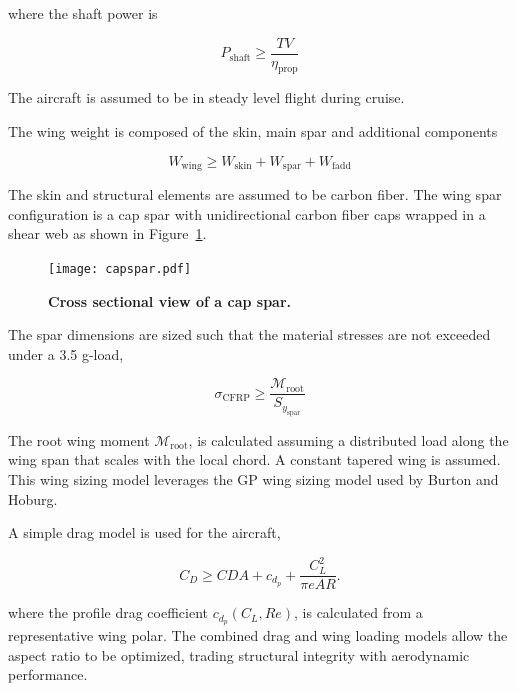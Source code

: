 \documentclass[]{aiaa-tc}%
\begin{document}
where the shaft power is 

\begin{equation}
    P_{\mathrm{shaft}} \geq \frac{TV}{\eta_{\mathrm{prop}}}
\end{equation}

The aircraft is assumed to be in steady level flight during cruise. 

The wing weight is composed of the skin, main spar and additional components

\begin{equation}
    W_{\mathrm{wing}} \geq W_{\mathrm{skin}} + W_{\mathrm{spar}} + W_{\mathrm{fadd}}
\end{equation}

The skin and structural elements are assumed to be carbon fiber.  
The wing spar configuration is a cap spar with unidirectional carbon fiber caps wrapped in a shear web as shown in Figure~\ref{f:capspar}.  

\begin{figure}[h!]
	\begin{center}
	\texttt{[image: capspar.pdf]}
    \caption{\textbf{Cross sectional view of a cap spar.}}
	\label{f:capspar}
	\end{center}
\end{figure}

The spar dimensions are sized such that the material stresses are not exceeded under a 3.5 g-load,

\begin{equation}
    \sigma_{\mathrm{CFRP}} \geq \frac{\mathcal{M}_{\mathrm{root}}}{S_{y_{\mathrm{spar}}}}
\end{equation}

The root wing moment $\mathcal{M}_{\mathrm{root}}$, is calculated assuming a distributed load along the wing span that scales with the local chord.\cite{bending}
A constant tapered wing is assumed.  
This wing sizing model leverages the GP wing sizing model used by Burton and Hoburg.\cite{burton_solar_2017} 

A simple drag model is used for the aircraft, 

\begin{equation}
    C_D \geq CDA + c_{d_p} + \frac{C_L^2}{\pi e AR}.
\end{equation}

where the profile drag coefficient $c_{d_p}(C_L, Re)$, is calculated from a representative wing polar. 
The combined drag and wing loading models allow the aspect ratio to be optimized, trading structural integrity with aerodynamic performance. 
\end{document}
